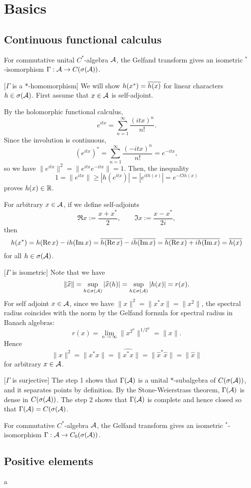 \documentclass{../exp}
\begin{document}
\section{Basics}
\subsection{Continuous functional calculus}
\begin{thm}
For commutative unital $C^*$-algebra $\mathcal{A}$, the Gelfand transform gives an isometric $^*$-isomorphism $\Gamma:\cA\to C(\sigma(\cA))$.
\end{thm}
\begin{pf}
[$\Gamma$ is a $*$-homomorphism]
We will show $h(x^*)=\overline{h(x)}$ for linear characters $h\in\sigma(\mathcal{A})$.
First assume that $x\in\mathcal{A}$ is self-adjoint.

By the holomorphic functional calculus,
\[e^{itx}=\sum_{n=1}^\infty\frac{(itx)^n}{n!}.\]
Since the involution is continuous,
\[(e^{itx})^*=\sum_{n=1}^\infty\frac{(-itx)^n}{n!}=e^{-itx},\]
so we have $\|e^{itx}\|^2=\|e^{itx}e^{-itx}\|=1$.
Then, the inequality
\[1=\|e^{itx}\|\ge|h(e^{itx})|=|e^{ith(x)}|=e^{-t\Im h(x)}\]
proves $h(x)\in\mathbb{R}$.

For arbitrary $x\in\mathcal{A}$, if we define self-adjoints
\[\Re x:=\frac{x+x^*}2,\qquad\Im x:=\frac{x-x^*}{2i},\]
then
\[h(x^*)=h(\operatorname{Re} x)-ih(\operatorname{Im} x)=\overline{h(\operatorname{Re} x)}-i\overline{h(\operatorname{Im} x)}=\overline{h(\operatorname{Re} x)+ih(\operatorname{Im} x)}=\overline{h(x)}\]
for all $h\in\sigma(\mathcal{A})$.

[$\Gamma$ is isometric]
Note that we have
\[\|\widehat x\|=\sup_{h\in\sigma(\mathcal{A})}|\widehat x(h)|=\sup_{h\in\sigma(\mathcal{A})}|h(x)|=r(x).\]
For self adjoint $x\in\mathcal{A}$, since we have $\|x\|^2=\|x^*x\|=\|x^2\|$, the spectral radius coincides with the norm by the Gelfand formula for spectral radius in Banach algebras:
\[r(x)=\lim_{n\to\infty}\|x^{2^n}\|^{1/2^n}=\|x\|.\]
Hence
\[\|x\|^2=\|x^*x\|=\|\hat{x^*x}\|=\|\hat{x}^*\hat{x}\|=\|\hat{x}\|\]
for arbitrary $x\in\mathcal{A}$.

[$\Gamma$ is surjective]
The step 1 shows that $\Gamma(\mathcal{A})$ is a unital $*$-subalgebra of $C(\sigma(\mathcal{A}))$, and it separates points by definition.
By the Stone-Weierstrass theorem, $\Gamma(\mathcal{A})$ is dense in $C(\sigma(\mathcal{A}))$.
The step 2 shows that $\Gamma(\mathcal{A})$ is complete and hence closed so that $\Gamma(\mathcal{A})=C(\sigma(\mathcal{A})$.
\end{pf}
\begin{thm}
For commutative $C^*$-algebra $\mathcal{A}$, the Gelfand transform gives an isometric $^*$-isomorphism $\Gamma:\cA\to C_0(\sigma(\cA))$.
\end{thm}


\subsection{Positive elements}
a
\end{document}
